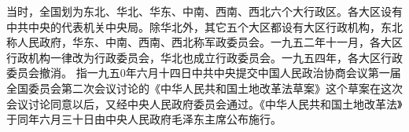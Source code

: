 \begin{maonote}
当时，全国划为东北、华北、华东、中南、西南、西北六个大行政区。各大区设有中共中央的代表机关中央局。除华北外，其它五个大区都设有大区行政机构，东北称人民政府，华东、中南、西南、西北称军政委员会。一九五二年十一月，各大区行政机构一律改为行政委员会，华北也成立行政委员会。一九五四年，各大区行政委员会撤消。
指一九五0年六月十四日中共中央提交中国人民政治协商会议第一届全国委员会第二次会议讨论的《中华人民共和国土地改革法草案》这个草案在这次会议讨论同意以后，又经中央人民政府委员会通过。《中华人民共和国土地改革法》于同年六月三十日由中央人民政府毛泽东主席公布施行。
\end{maonote}
